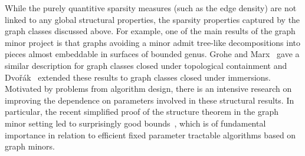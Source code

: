 While the purely quantitive sparsity measures (such as the edge density) are not linked to any global structural properties,
the sparsity properties captured by the graph classes discussed above.
For example, one of the main results of the graph minor project is that
graphs avoiding a minor admit tree-like decompositions into pieces almost embeddable in surfaces of bounded genus.
Grohe and Marx~\cite{GroheM15} gave a similar description for graph classes closed under topological containment and
Dvo\v r\'ak~\cite{Dvorak12} extended these results to graph classes closed under immersions.
Motivated by problems from algorithm design,
there is an intensive research on improving the dependence on parameters involved in these structural results.
In particular,
the recent simplified proof of the structure theorem in the graph minor setting
led to surprisingly good bounds~\cite{KawarabayashiTW18},
which is of fundamental importance in relation to efficient fixed parameter tractable algorithms based on graph minors.
